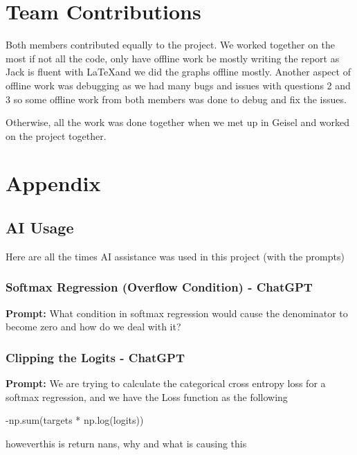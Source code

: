 \documentclass{article}
\begin{document}
\section{Team Contributions}
Both members contributed equally to the project. We worked together on the
most if not all the code, only have offline work be mostly writing the report
as Jack is fluent with \LaTeX and we did the graphs offline mostly. Another aspect of 
offline work was debugging as we had many bugs and issues with questions 2 and 3
so some offline work from both members was done to debug and fix the issues. 

Otherwise, all the work was done together when we met up in Geisel and worked on the
project together.

\appendix
\section{Appendix}
\label{sec:appendix}

\subsection{AI Usage}
Here are all the times AI assistance was used in this project (with the prompts)

\subsubsection{Softmax Regression (Overflow Condition) - ChatGPT}
\label{sec:appendix:softmax_overflow-ai}
\textbf{Prompt:} What condition in softmax regression would cause the denominator to become zero and how do we deal with it?

\subsubsection{Clipping the Logits - ChatGPT}
\label{sec:appendix:clipping_logits-ai}
\textbf{Prompt:} 
We are trying to calculate the categorical cross entropy loss for a softmax regression, and we have the Loss function as the following

-np.sum(targets * np.log(logits))

howeverthis is return nans, why and what is causing this
\end{document}
